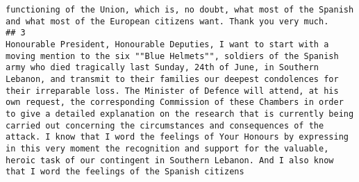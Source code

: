 \documentclass[
]{article}
\begin{document}
\begin{verbatim}
functioning of the Union, which is, no doubt, what most of the Spanish and what most of the European citizens want. Thank you very much.
## 3                                                                                                                                                                                                                                                                                                                                                                                                                                                                                                                                                                                                                                                                                                                                                                                                                                                                                                                                                                                                                                                                                                                                                                                                                                                                                                                                                                                                                                                                                                                                                                                                                                                                                                                                                                                                                                                                                                                                                                                                                                                                                                                                                                                                                                                                                                                                                                                                                                                                                  Honourable President, Honourable Deputies, I want to start with a moving mention to the six ""Blue Helmets"", soldiers of the Spanish army who died tragically last Sunday, 24th of June, in Southern Lebanon, and transmit to their families our deepest condolences for their irreparable loss. The Minister of Defence will attend, at his own request, the corresponding Commission of these Chambers in order to give a detailed explanation on the research that is currently being carried out concerning the circumstances and consequences of the attack. I know that I word the feelings of Your Honours by expressing in this very moment the recognition and support for the valuable, heroic task of our contingent in Southern Lebanon. And I also know that I word the feelings of the Spanish citizens 
\end{verbatim}
\end{document}
